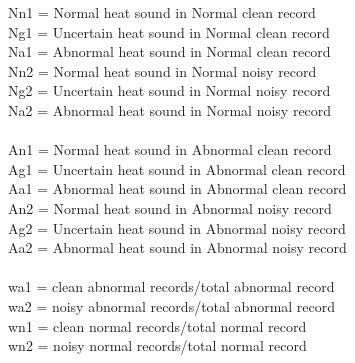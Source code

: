 \documentclass[12pt]{article}
\begin{document}
\noindent
Nn1 = Normal heat sound in Normal clean record\\
Ng1 = Uncertain heat sound in Normal clean record\\
Na1 = Abnormal heat sound in Normal clean record\\
Nn2 = Normal heat sound in Normal noisy record\\
Ng2 = Uncertain heat sound in Normal noisy record\\
Na2 = Abnormal heat sound in Normal noisy record\\
\\
An1 = Normal heat sound in Abnormal clean record\\
Ag1 = Uncertain heat sound in Abnormal clean record\\
Aa1 = Abnormal heat sound in Abnormal clean record\\
An2 = Normal heat sound in Abnormal noisy record\\
Ag2 = Uncertain heat sound in Abnormal noisy record\\
Aa2 = Abnormal heat sound in Abnormal noisy record\\
\\	
wa1 = clean abnormal records/total abnormal record\\
wa2 = noisy abnormal records/total abnormal record\\
wn1 = clean normal records/total normal record\\
wn2 = noisy normal records/total normal record\\
\end{document}
